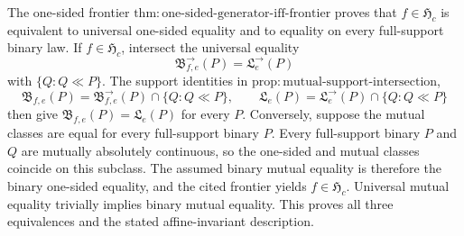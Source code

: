 The one-sided frontier \(\mathrm{thm:one\text{-}sided\text{-}generator\text{-}iff\text{-}frontier}\) proves that \(f\in\mathfrak H_c\) is equivalent to universal one-sided equality and to equality on every full-support binary law.  If \(f\in\mathfrak H_c\), intersect the universal equality
\[
 \mathfrak B^{\to}_{f,e}(P)=\mathfrak L^{\to}_e(P)
\]
with \(\{Q:Q\ll P\}\).  The support identities in \(\mathrm{prop:mutual\text{-}support\text{-}intersection}\),
\[
 \mathfrak B_{f,e}(P)=\mathfrak B^{\to}_{f,e}(P)\cap\{Q:Q\ll P\},
 \qquad
 \mathfrak L_e(P)=\mathfrak L^{\to}_e(P)\cap\{Q:Q\ll P\}
\]
then give \(\mathfrak B_{f,e}(P)=\mathfrak L_e(P)\) for every \(P\).  Conversely, suppose the mutual classes are equal for every full-support binary \(P\).  Every full-support binary \(P\) and \(Q\) are mutually absolutely continuous, so the one-sided and mutual classes coincide on this subclass.  The assumed binary mutual equality is therefore the binary one-sided equality, and the cited frontier yields \(f\in\mathfrak H_c\).  Universal mutual equality trivially implies binary mutual equality.  This proves all three equivalences and the stated affine-invariant description.